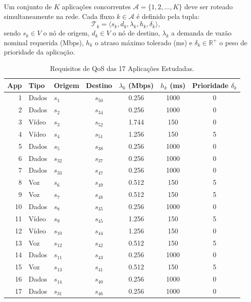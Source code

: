 \documentclass[journal]{IEEEtran}
\begin{document}
Um conjunto de $K$ aplica\c{c}\~{o}es concorrentes $\mathcal{A} = \{1, 2, \dots, K\}$ deve ser roteado simultaneamente na rede. Cada fluxo $k \in \mathcal{A}$ \'{e} definido pela tupla:
\begin{equation}
\mathcal{T}_k = \langle s_k, d_k, \lambda_k, h_k, \delta_k \rangle,
\end{equation}
sendo $s_k \in V$ o n\'{o} de origem, $d_k \in V$ o n\'{o} de destino, $\lambda_k$ a demanda de vaz\~{a}o nominal requerida (Mbps), $h_k$ o atraso m\'{a}ximo tolerado (ms) e $\delta_k \in \mathbb{R}^+$ o peso de prioridade da aplica\c{c}\~{a}o.

\begin{table}[!t]
\caption{Requisitos de QoS das 17 Aplica\c{c}\~{o}es Estudadas.}
\label{tab:apps}
\centering
\footnotesize
\setlength{\tabcolsep}{3.2pt}
\renewcommand{\arraystretch}{1.1}
\begin{tabular}{@{}rllcccc@{}}
\toprule
\textbf{App} & \textbf{Tipo} & \textbf{Origem} & \textbf{Destino} & $\lambda_k$ (Mbps) & $h_k$ (ms) & Prioridade $\delta_k$ \\
\midrule
1  & Dados & $s_1$  & $s_{50}$ & 0.256 & 1000 & 0 \\
2  & Dados & $s_2$  & $s_{34}$ & 0.256 & 1000 & 0 \\
3  & V\'{i}deo & $s_3$  & $s_{52}$ & 1.744 & 150  & 0 \\
4  & V\'{i}deo & $s_4$  & $s_{51}$ & 1.256 & 150  & 5 \\
5  & Dados & $s_5$  & $s_{38}$ & 0.256 & 1000 & 0 \\
6  & Dados & $s_{32}$ & $s_{37}$ & 0.256 & 1000 & 0 \\
7  & Dados & $s_{33}$ & $s_{47}$ & 0.256 & 1000 & 0 \\
8  & Voz   & $s_6$  & $s_{49}$ & 0.512 & 150  & 5 \\
9  & Voz   & $s_7$  & $s_{48}$ & 0.512 & 150  & 5 \\
10 & Dados & $s_8$  & $s_{35}$ & 0.256 & 1000 & 0 \\
11 & V\'{i}deo & $s_9$  & $s_{45}$ & 1.256 & 150  & 5 \\
12 & V\'{i}deo & $s_{10}$ & $s_{44}$ & 1.256 & 150  & 0 \\
13 & Voz   & $s_{12}$ & $s_{42}$ & 0.512 & 150  & 5 \\
14 & Dados & $s_{11}$ & $s_{43}$ & 0.256 & 1000 & 0 \\
15 & Voz   & $s_{13}$ & $s_{41}$ & 0.512 & 150  & 5 \\
16 & Dados & $s_{14}$ & $s_{40}$ & 0.256 & 1000 & 0 \\
17 & Dados & $s_{31}$ & $s_{46}$ & 0.256 & 1000 & 0 \\
\bottomrule
\end{tabular}
\end{table}
\end{document}
